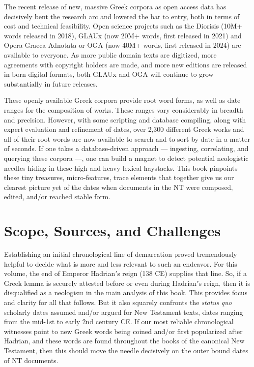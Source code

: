 The recent release of new, massive Greek corpora as open access data %
has decisively bent the research arc and lowered the bar to entry, 
both in terms of cost and technical feasibility. %
Open science projects such as the Diorisis (10M+ words released in 2018), %
GLAUx (now 20M+ words, first released in 2021) and Opera Graeca Adnotata %
or OGA (now 40M+ words, first released in 2024) are available to everyone. %
As more public domain texts are digitized, more agreements with copyright holders are made, %
and more new editions are released in born-digital formats, %
both GLAUx and OGA will continue to grow substantially in future releases.

These openly available Greek corpora provide root word forms, %
as well as date ranges for the composition of works. %
These ranges vary considerably in breadth and precision. %
However, with some scripting and database compiling, %
along with expert evaluation and refinement of dates, %
over 2,300 different Greek works and all of their root words %
are now available to search and to sort by date in a matter of seconds.
If one takes a database-driven approach --- ingesting, correlating, %
and querying these corpora ---, one can build a magnet to detect %
potential neologistic needles hiding in these high and heavy lexical haystacks. %
This book pinpoints these tiny treasures, %
micro-features, trace elements that together give us our clearest picture %
yet of the dates when documents in the NT were composed, edited, and/or reached stable form. %

\section{Scope, Sources, and Challenges}

\noindent{}Establishing an initial chronological line of demarcation %
proved tremendously helpful to decide %
what is more and less relevant to such an endeavor. %
For this volume, the end of Emperor Hadrianʼs reign (138 CE) supplies that line. %
So, if a Greek lemma is securely attested before or even during Hadrianʼs reign, %
then it is disqualified as a neologism in the main analysis of this book. %
This provides focus and clarity for all that follows. %
But it also squarely confronts the \textit{status quo} scholarly dates %
assumed and/or argued for New Testament texts, %
dates ranging from the mid-1st to early 2nd century CE. %
If our most reliable chronological witnesses %
point to new Greek words being coined and/or first popularized after Hadrian, %
and these words are found throughout the books of the canonical New Testament, %
then this should move the needle decisively on the outer bound dates of NT documents. %


